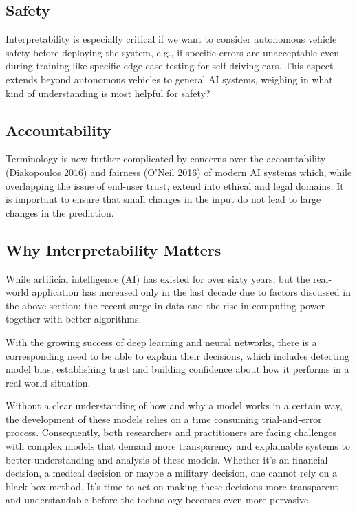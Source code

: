 \subsection{Safety}
Interpretability is especially critical if we want to consider autonomous vehicle safety before deploying the system, e.g., if specific errors are unacceptable even during training like specific edge case testing for self-driving cars. This aspect extends beyond autonomous vehicles to general AI systems, weighing in what kind of understanding is most helpful for safety?

\subsection{Accountability}
Terminology is now further complicated by concerns over the accountability (Diakopoulos 2016) and fairness (O’Neil 2016) of modern AI systems which, while overlapping the issue of end-user trust, extend into ethical and legal domains. It is important to ensure that small changes in the input do not lead to large changes in the prediction.

\subsection{Why Interpretability Matters}

While artificial intelligence (AI) has existed for over sixty years, but the real-world application has increased only in the last decade due to factors discussed in the above section: the recent surge in data and the rise in computing power together with better algorithms.

With the growing success of deep learning and neural networks, there is a corresponding need to be able to explain their decisions, which includes detecting model bias, establishing trust and building confidence about how it performs in a real-world situation.

Without a clear understanding of how and why a model works in a certain way, the development of these models relies on a time consuming trial-and-error process. Consequently, both researchers and practitioners are facing challenges with complex models that demand more transparency and explainable systems to better understanding and analysis of these models. Whether it's an financial decision, a medical decision or maybe a military decision, one cannot rely on a black box method. It's time to act on making these decisions more transparent and understandable before the technology becomes even more pervasive.

